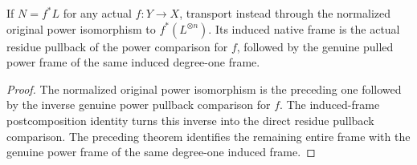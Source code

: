 \begin{corollary}\label{cor:actual-induced-normalized-power-frame}
\leanok
{}
If $N=f^*L$ for any actual $f:Y\to X$, transport instead through
the normalized original power isomorphism to $f^*(L^{\otimes n})$.
Its induced native frame is the actual residue pullback of the
power comparison for $f$, followed by the genuine pulled power
frame of the same induced degree-one frame.
\end{corollary}
\begin{proof}
The normalized original power isomorphism is the preceding one
followed by the inverse genuine power pullback comparison for
$f$. The induced-frame postcomposition identity turns this
inverse into the direct residue pullback comparison. The
preceding theorem identifies the remaining entire frame with
the genuine power frame of the same degree-one induced frame.
\end{proof}
